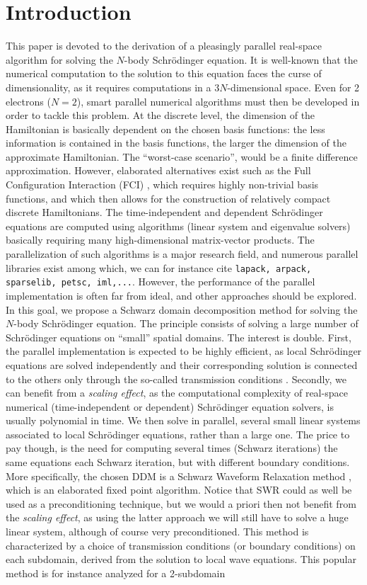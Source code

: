 \documentclass[11pt]{elsarticle}
\begin{document}
\section{Introduction}\label{NBODY}
This paper is devoted to the derivation of a pleasingly parallel real-space algorithm for solving the $N$-body Schr\"odinger equation. It is well-known that the numerical computation to the solution to this equation faces the curse of dimensionality, as it requires computations in a $3N$-dimensional space. Even for 2 electrons ($N=2$), smart parallel numerical algorithms must then be developed in order to tackle this problem. At the discrete level, the dimension of the Hamiltonian is basically dependent on the chosen basis functions: the less information is contained in the basis functions, the larger the dimension of the approximate Hamiltonian. The ``worst-case scenario'', would be a finite difference approximation. However, elaborated alternatives exist such as the Full Configuration Interaction (FCI) \cite{ostlund}, which requires highly non-trivial basis functions, and which then allows for the construction of relatively compact discrete Hamiltonians. The time-independent and dependent Schr\"odinger equations are computed using algorithms (linear system and eigenvalue solvers) basically requiring many high-dimensional matrix-vector products. The parallelization of such algorithms is a major research field, and numerous parallel libraries exist among which, we can for instance cite {\tt lapack, arpack, sparselib, petsc, iml,...}. However, the performance of the parallel implementation is often far from ideal, and other approaches should be explored. In this goal, we propose a Schwarz domain decomposition method for solving the $N$-body Schr\"odinger equation. The principle consists of solving a large number of Schr\"odinger equations on ``small'' spatial domains. The interest is double. First, the parallel implementation is expected to be highly efficient, as local Schr\"odinger equations are solved independently and their corresponding solution is connected to the others only through the so-called transmission conditions \cite{DoleanBook}. Secondly, we can benefit from a {\it scaling effect}, as the computational complexity of real-space numerical (time-independent or dependent) Schr\"odinger equation solvers, is usually polynomial in time. We then solve in parallel, several small linear systems associated to local Schr\"odinger equations, rather than a large one. The price to pay though, is the need for computing several times (Schwarz iterations) the same equations each Schwarz iteration, but with different boundary conditions. More specifically, the chosen DDM is a Schwarz Waveform Relaxation method \cite{halpern3,GanderHalpernNataf,halpern2,jsc}, which is an elaborated fixed point algorithm. Notice that SWR could as well be used as a preconditioning technique, but we would a priori then not benefit from the {\it scaling effect}, as using the latter approach we will still have to solve a huge linear system, although of course very preconditioned. This method is characterized by a choice of transmission conditions (or boundary conditions) on each subdomain, derived from the solution to local wave equations.  This popular method is for instance analyzed for a 2-subdomain 
\end{document}

